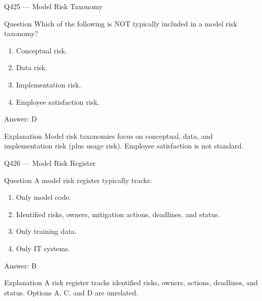\documentclass[aspectratio=169,8pt]{beamer}
\begin{document}
	\begin{frame}{Q425 --- Model Risk Taxonomy}
		\begin{block}{Question}
			Which of the following is NOT typically included in a model risk taxonomy?
			\begin{enumerate}
				\item Conceptual risk.
				\item Data risk.
				\item Implementation risk.
				\item Employee satisfaction risk.
			\end{enumerate}
		\end{block}
		\begin{exampleblock}{Answer: D}\end{exampleblock}
		\begin{block}{Explanation}
			Model risk taxonomies focus on conceptual, data, and implementation risk (plus usage risk). Employee satisfaction is not standard.
		\end{block}
	\end{frame}
	
	\begin{frame}{Q426 --- Model Risk Register}
		\begin{block}{Question}
			A model risk register typically tracks:
			\begin{enumerate}
				\item Only model code.
				\item Identified risks, owners, mitigation actions, deadlines, and status.
				\item Only training data.
				\item Only IT systems.
			\end{enumerate}
		\end{block}
		\begin{exampleblock}{Answer: B}\end{exampleblock}
		\begin{block}{Explanation}
			A risk register tracks identified risks, owners, actions, deadlines, and status. Options A, C, and D are unrelated.
		\end{block}
	\end{frame}
	
\end{document}

